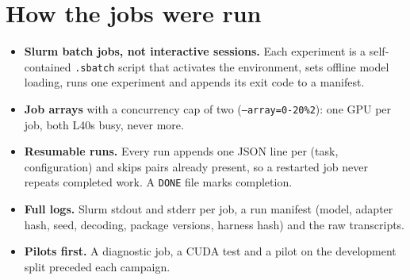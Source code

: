 \documentclass[10.5pt,a4paper,oneside]{report}
\begin{document}
\section{How the jobs were run}
\begin{itemize}
\item \textbf{Slurm batch jobs, not interactive sessions.} Each experiment is a self-contained \texttt{.\allowbreak{}sbatch} script that activates the environment, sets offline model loading, runs one experiment and appends its exit code to a manifest.
\item \textbf{Job arrays} with a concurrency cap of two (\texttt{--array=0-20\%2}): one GPU per job, both L40s busy, never more.
\item \textbf{Resumable runs.} Every run appends one JSON line per (task, configuration) and skips pairs already present, so a restarted job never repeats completed work. A \texttt{DONE} file marks completion.
\item \textbf{Full logs.} Slurm stdout and stderr per job, a run manifest (model, adapter hash, seed, decoding, package versions, harness hash) and the raw transcripts.
\item \textbf{Pilots first.} A diagnostic job, a CUDA test and a pilot on the development split preceded each campaign.
\end{itemize}
\end{document}
